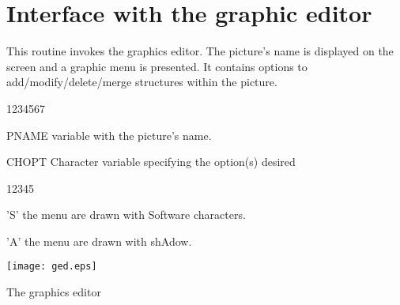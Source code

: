 \section{Interface with the graphic editor}
\Action
This routine invokes the graphics editor. The picture's name is displayed on the
screen and a graphic menu is presented. It contains options to
add/modify/delete/merge structures within the picture.
\Pdesc
\begin{DLtt}{1234567}
\item[PNAME]  variable with the picture's name.
\item[CHOPT] Character variable specifying the option(s) desired
\begin{DLtt}{12345}
\item['S'] the menu are drawn with Software characters.
\item['A'] the menu are drawn with shAdow.
\end{DLtt}
\end{DLtt}

\clearpage

\begin{minipage}{\textwidth}
\begin{Fighere}
\begin{center}
\texttt{[image: ged.eps]}
\end{center}
\caption{The graphics editor}
\label{fig-GED}
\end{Fighere}       
\end{minipage}
